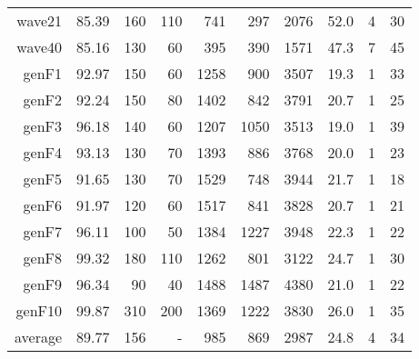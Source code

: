 \begin{table}
\begin{tabular}{|r|r|r|r|r|r|r|r|r|r|}
{\sc wave21} & 85.39 & 160 & 110 & 741 & 297 & 2076 & 52.0 & 4 & 30 \\
{\sc wave40} & 85.16 & 130 & 60 & 395 & 390 & 1571 & 47.3 & 7 & 45 \\
{\sc genF1} & 92.97 & 150 & 60 & 1258 & 900 & 3507 & 19.3 & 1 & 33 \\
{\sc genF2} & 92.24 & 150 & 80 & 1402 & 842 & 3791 & 20.7 & 1 & 25 \\
{\sc genF3} & 96.18 & 140 & 60 & 1207 & 1050 & 3513 & 19.0 & 1 & 39 \\
{\sc genF4} & 93.13 & 130 & 70 & 1393 & 886 & 3768 & 20.0 & 1 & 23 \\
{\sc genF5} & 91.65 & 130 & 70 & 1529 & 748 & 3944 & 21.7 & 1 & 18 \\
{\sc genF6} & 91.97 & 120 & 60 & 1517 & 841 & 3828 & 20.7 & 1 & 21 \\
{\sc genF7} & 96.11 & 100 & 50 & 1384 & 1227 & 3948 & 22.3 & 1 & 22 \\
{\sc genF8} & 99.32 & 180 & 110 & 1262 & 801 & 3122 & 24.7 & 1 & 30 \\
{\sc genF9} & 96.34 & 90 & 40 & 1488 & 1487 & 4380 & 21.0 & 1 & 22 \\
{\sc genF10} & 99.87 & 310 & 200 & 1369 & 1222 & 3830 & 26.0 & 1 & 35 \\
\hline
average & 89.77 & 156 &  -  & 985 & 869 & 2987 & 24.8 & 4 & 34 \\
\hline
\end{tabular}
\end{table}
\clearpage
